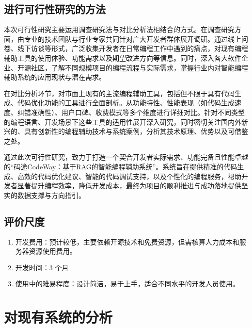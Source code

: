 \documentclass[
    report,     %
    oneside,    %
    UTF8,       %
    zihao=-4    %
]{config} %
\begin{document}
\subsection{进行可行性研究的方法}
本次可行性研究主要运用调查研究法与对比分析法相结合的方式。在调查研究方面，由专业的技术团队与行业专家共同针对广大开发者群体展开调研。通过线上问卷、线下访谈等形式，广泛收集开发者在日常编程工作中遇到的痛点，对现有编程辅助工具的使用体验、功能需求以及期望改进方向等信息。同时，深入各大软件企业、开源社区，了解不同规模项目的编程流程与实际需求，掌握行业内对智能编程辅助系统的应用现状与潜在需求。

在对比分析环节，对市面上现有的主流编程辅助工具，包括但不限于具有代码生成、代码优化功能的工具进行全面剖析。从功能特性、性能表现（如代码生成速度、纠错准确性）、用户口碑、收费模式等多个维度进行详细对比。针对不同类型的编程语言、开发场景下这些工具的适用性展开深入研究，同时密切关注国内外新兴的、具有创新性的编程辅助技术与系统案例，分析其技术原理、优势以及可借鉴之处。

通过此次可行性研究，致力于打造一个契合开发者实际需求、功能完备且性能卓越的“码途CodeWay：基于RAG的智能编程辅助系统”。系统旨在提供精准的代码生成、高效的代码优化建议、智能的代码调试支持，以及个性化的编程服务，帮助开发者显著提升编程效率，降低开发成本，最终为项目的顺利推进与成功落地提供坚实的数据支撑与方向指引。 

\subsection{评价尺度}
\begin{enumerate}[label=(\arabic*)]
    \item 开发费用：预计较低，主要依赖开源技术和免费资源，但需核算人力成本和服务器资源使用费用。
    \item 开发时间：3 个月
    \item 使用中的难易程度：设计简洁，易于上手，适合不同水平的开发人员使用。
\end{enumerate}
\newpage
\section{对现有系统的分析}
\end{document}
